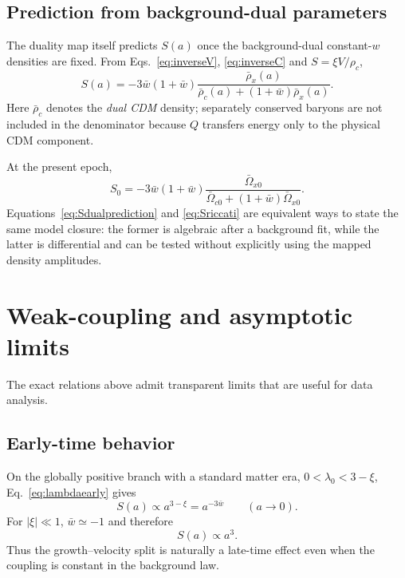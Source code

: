\documentclass[11pt]{article}
\theoremstyle{remark}
\begin{document}
\subsection{Prediction from background-dual parameters}

The duality map itself predicts $S(a)$ once the background-dual constant-$w$ densities are fixed.  From Eqs.~\eqref{eq:inverseV}, \eqref{eq:inverseC} and $S=\xi V/\rho_c$,
\begin{equation}
    \boxed{
    S(a)=
    -3\bar w(1+\bar w)
    \frac{\bar\rho_x(a)}
    {\bar\rho_c(a)+(1+\bar w)\bar\rho_x(a)}.}
    \label{eq:Sdualprediction}
\end{equation}
Here $\bar\rho_c$ denotes the \emph{dual CDM} density; separately conserved baryons are not included in the denominator because $Q$ transfers energy only to the physical CDM component.

At the present epoch,
\begin{equation}
    S_0=
    -3\bar w(1+\bar w)
    \frac{\bar\Omega_{x0}}
    {\bar\Omega_{c0}+(1+\bar w)\bar\Omega_{x0}}.
    \label{eq:S0dual}
\end{equation}
Equations~\eqref{eq:Sdualprediction} and \eqref{eq:Sriccati} are equivalent ways to state the same model closure: the former is algebraic after a background fit, while the latter is differential and can be tested without explicitly using the mapped density amplitudes.

\section{Weak-coupling and asymptotic limits}
\label{sec:limits}

The exact relations above admit transparent limits that are useful for data analysis.

\subsection{Early-time behavior}

On the globally positive branch with a standard matter era,
$0<\lambda_0<3-\xi$, Eq.~\eqref{eq:lambdaearly} gives
\begin{equation}
    S(a)\propto a^{3-\xi}=a^{-3\bar w}
    \qquad(a\to0).
    \label{eq:NearlyS}
\end{equation}
For $|\xi|\ll1$, $\bar w\simeq-1$ and therefore
\begin{equation}
    S(a)\propto a^3.
    \label{eq:a3}
\end{equation}
Thus the growth--velocity split is naturally a late-time effect even when the coupling is constant in the background law.
\end{document}
